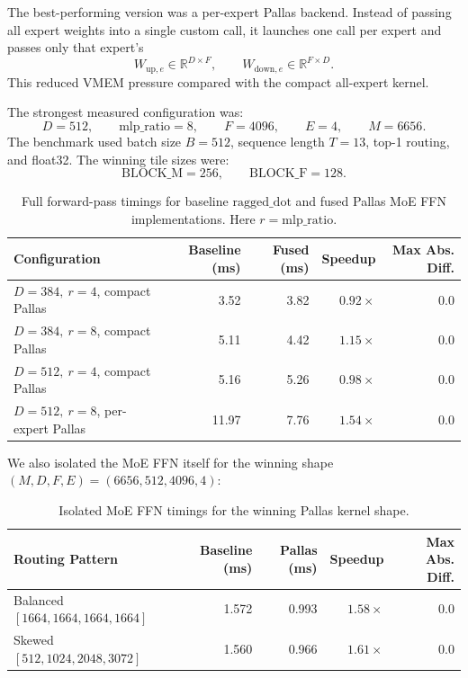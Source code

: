 \documentclass[11pt]{article}
\begin{document}
The best-performing version was a per-expert Pallas backend. Instead of passing
all expert weights into a single custom call, it launches one call per expert
and passes only that expert's
\[
  W_{\mathrm{up},e}\in\mathbb{R}^{D\times F},\qquad
  W_{\mathrm{down},e}\in\mathbb{R}^{F\times D}.
\]
This reduced VMEM pressure compared with the compact all-expert kernel.

The strongest measured configuration was:
\[
  D = 512,\qquad \mathrm{mlp\_ratio}=8,\qquad F=4096,\qquad
  E=4,\qquad M=6656.
\]
The benchmark used batch size \(B=512\), sequence length \(T=13\), top-1
routing, and float32. The winning tile sizes were:
\[
  \mathrm{BLOCK\_M}=256,\qquad \mathrm{BLOCK\_F}=128.
\]

\begin{table}[h]
\centering
\begin{tabular}{lrrrr}
\toprule
Configuration & Baseline (ms) & Fused (ms) & Speedup & Max Abs. Diff. \\
\midrule
\(D=384,\ r=4\), compact Pallas & 3.52 & 3.82 & \(0.92\times\) & 0.0 \\
\(D=384,\ r=8\), compact Pallas & 5.11 & 4.42 & \(1.15\times\) & 0.0 \\
\(D=512,\ r=4\), compact Pallas & 5.16 & 5.26 & \(0.98\times\) & 0.0 \\
\(D=512,\ r=8\), per-expert Pallas & 11.97 & 7.76 & \(1.54\times\) & 0.0 \\
\bottomrule
\end{tabular}
\caption{Full forward-pass timings for baseline \(\mathrm{ragged\_dot}\) and
fused Pallas MoE FFN implementations. Here \(r=\mathrm{mlp\_ratio}\).}
\end{table}

We also isolated the MoE FFN itself for the winning shape
\((M,D,F,E)=(6656,512,4096,4)\):

\begin{table}[h]
\centering
\begin{tabular}{lrrrr}
\toprule
Routing Pattern & Baseline (ms) & Pallas (ms) & Speedup & Max Abs. Diff. \\
\midrule
Balanced \([1664,1664,1664,1664]\) & 1.572 & 0.993 & \(1.58\times\) & 0.0 \\
Skewed \([512,1024,2048,3072]\) & 1.560 & 0.966 & \(1.61\times\) & 0.0 \\
\bottomrule
\end{tabular}
\caption{Isolated MoE FFN timings for the winning Pallas kernel shape.}
\end{table}
\end{document}
